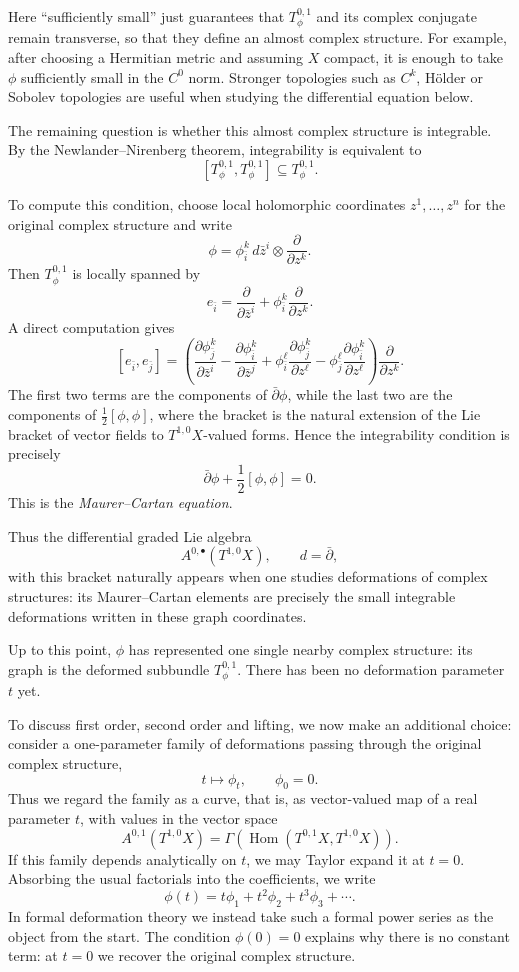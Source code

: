 Here ``sufficiently small'' just guarantees that
$T^{0,1}_\phi$ and its complex conjugate remain
transverse, so that they define an almost complex
structure. For example, after choosing a Hermitian
metric and assuming $X$ compact, it is enough to take
$\phi$ sufficiently small in the $C^0$ norm. Stronger
topologies such as $C^k$, H\"older or Sobolev topologies
are useful when studying the differential equation below.

The remaining question is whether this almost complex
structure is integrable. By the Newlander--Nirenberg
theorem, integrability is equivalent to
$$
[T^{0,1}_\phi,T^{0,1}_\phi]
\subseteq T^{0,1}_\phi.
$$

To compute this condition, choose local holomorphic
coordinates $z^1,\ldots,z^n$ for the original complex
structure and write
$$
\phi=
\phi^k_{\bar i}\,d\bar z^i\otimes
\frac{\partial}{\partial z^k}.
$$
Then $T^{0,1}_\phi$ is locally spanned by
$$
e_{\bar i}
=\frac{\partial}{\partial\bar z^i}
+\phi^k_{\bar i}\frac{\partial}{\partial z^k}.
$$
A direct computation gives
$$
[e_{\bar i},e_{\bar j}]
=
\left(
\frac{\partial\phi^k_{\bar j}}{\partial\bar z^i}
-\frac{\partial\phi^k_{\bar i}}{\partial\bar z^j}
+\phi^\ell_{\bar i}
\frac{\partial\phi^k_{\bar j}}{\partial z^\ell}
-\phi^\ell_{\bar j}
\frac{\partial\phi^k_{\bar i}}{\partial z^\ell}
\right)
\frac{\partial}{\partial z^k}.
$$
The first two terms are the components of
$\bar\partial\phi$, while the last two are the
components of $\frac12[\phi,\phi]$, where the bracket
is the natural extension of the Lie bracket of vector
fields to $T^{1,0}X$-valued forms. Hence the
integrability condition is precisely
$$
\boxed{
\bar\partial\phi+\frac12[\phi,\phi]=0.
}
$$
This is the \emph{Maurer--Cartan equation}.

Thus the differential graded Lie algebra
$$
A^{0,\bullet}(T^{1,0}X),
\qquad d=\bar\partial,
$$
with this bracket naturally appears when one studies
deformations of complex structures: its
Maurer--Cartan elements are precisely the small
integrable deformations written in these graph
coordinates.

Up to this point, $\phi$ has represented one single
nearby complex structure: its graph is the deformed
subbundle $T^{0,1}_\phi$. There has been no deformation
parameter $t$ yet.

To discuss first order, second order and lifting, we now
make an additional choice: consider a one-parameter family
of deformations passing through the original complex
structure,
$$
t\longmapsto \phi_t,
\qquad
\phi_0=0.
$$
Thus we regard the family as a curve,
that is, as vector-valued 
map of a real parameter $t$, 
with values in the
vector space
$$
A^{0,1}(T^{1,0}X)
=\Gamma\!\left(\operatorname{Hom}
(T^{0,1}X,T^{1,0}X)\right).
$$
If this family depends analytically on $t$, we may Taylor
expand it at $t=0$. Absorbing the usual factorials into the
coefficients, we write
$$
\phi(t)=t\phi_1+t^2\phi_2+t^3\phi_3+\cdots.
$$
In formal deformation theory we instead take such a formal
power series as the object from the start. The condition
$\phi(0)=0$ explains why there is no constant term: at
$t=0$ we recover the original complex structure.


